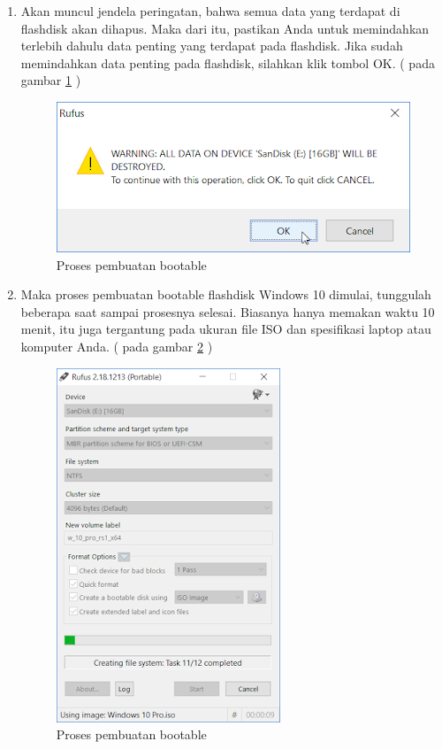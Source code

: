 \begin{enumerate}
  \item Akan muncul jendela peringatan, bahwa semua data yang terdapat di flashdisk akan dihapus. Maka dari itu, pastikan Anda untuk memindahkan terlebih dahulu data penting yang terdapat pada flashdisk. Jika sudah memindahkan data penting pada flashdisk, silahkan klik tombol OK. ( pada gambar \ref{labelgambar4} )
      \begin{figure}[h!]
	\centering
	\includegraphics[scale=0.4]{figures/4.png}
	\caption{Proses pembuatan bootable}
	\label{labelgambar4}
	\end{figure}

  \item Maka proses pembuatan bootable flashdisk Windows 10 dimulai, tunggulah beberapa saat sampai prosesnya selesai. Biasanya hanya memakan waktu 10 menit, itu juga tergantung pada ukuran file ISO dan spesifikasi laptop atau komputer Anda. ( pada gambar \ref{labelgambar5} )
       \begin{figure}[h!]
	\centering
	\includegraphics[scale=0.4]{figures/5.png}
	\caption{Proses pembuatan bootable}
	\label{labelgambar5}
	\end{figure}


\end{enumerate}
